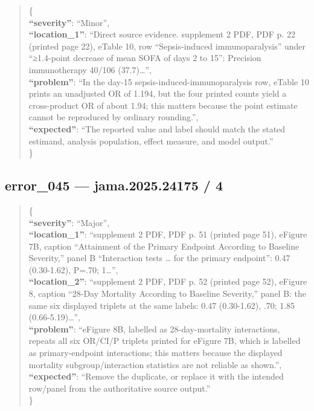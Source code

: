 \documentclass[
  letterpaper,
  9pt]{extreport}
\begin{document}
\begin{quote}
\{\\
\textbf{``severity''}: ``Minor'',\\
\textbf{``location\_1''}: ``Direct source evidence. supplement 2 PDF,
PDF p. 22 (printed page 22), eTable 10, row ``Sepsis-induced
immunoparalysis'' under ``≥1.4-point decrease of mean SOFA of days 2 to
15'': Precision immunotherapy 40/106 (37.7)\ldots{}'',\\
\textbf{``problem''}: ``In the day-15 sepsis-induced-immunoparalysis
row, eTable 10 prints an unadjusted OR of 1.194, but the four printed
counts yield a cross-product OR of about 1.94; this matters because the
point estimate cannot be reproduced by ordinary rounding.'',\\
\textbf{``expected''}: ``The reported value and label should match the
stated estimand, analysis population, effect measure, and model
output.''\\
\}
\end{quote}

\hypertarget{error_045--jama202524175--4}{%
\subsection{error\_045 --- jama.2025.24175 /
4}\label{error_045--jama202524175--4}}

\begin{quote}
\{\\
\textbf{``severity''}: ``Major'',\\
\textbf{``location\_1''}: ``supplement 2 PDF, PDF p. 51 (printed page
51), eFigure 7B, caption ``Attainment of the Primary Endpoint According
to Baseline Severity,'' panel B ``Interaction tests \ldots{} for the
primary endpoint'': 0.47 (0.30-1.62), P=.70; 1\ldots{}'',\\
\textbf{``location\_2''}: ``supplement 2 PDF, PDF p. 52 (printed page
52), eFigure 8, caption ``28-Day Mortality According to Baseline
Severity,'' panel B: the same six displayed triplets at the same labels:
0.47 (0.30-1.62), .70; 1.85 (0.66-5.19)\ldots{}'',\\
\textbf{``problem''}: ``eFigure 8B, labelled as 28-day-mortality
interactions, repeats all six OR/CI/P triplets printed for eFigure 7B,
which is labelled as primary-endpoint interactions; this matters because
the displayed mortality subgroup/interaction statistics are not reliable
as shown.'',\\
\textbf{``expected''}: ``Remove the duplicate, or replace it with the
intended row/panel from the authoritative source output.''\\
\}
\end{quote}
\end{document}
